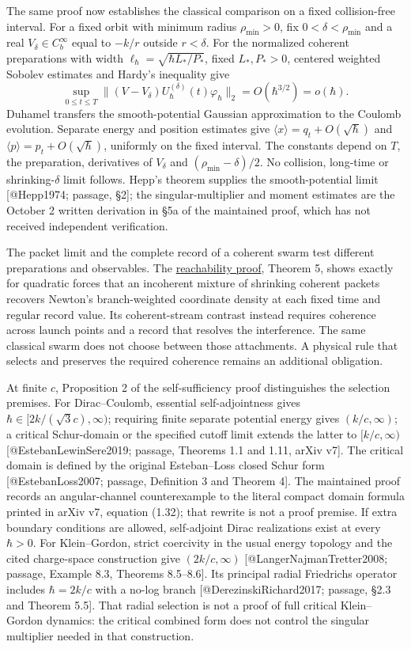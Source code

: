 \documentclass[11pt,a4paper]{article}
\begin{document}
The same proof now establishes the classical comparison on a fixed
collision-free interval. For a fixed orbit with minimum radius
\(\rho_{\min}>0\), fix \(0<\delta<\rho_{\min}\) and a real
\(V_\delta\in C_b^\infty\) equal to \(-k/r\) outside \(r<\delta\). For
the normalized coherent preparations with width
\(\ell_\hbar=\sqrt{\hbar L_*/P_*}\), fixed \(L_*,P_*>0\), centered
weighted Sobolev estimates and Hardy's inequality give
\[\sup_{0\le t\le T}\|(V-V_\delta)U_\hbar^{(\delta)}(t)\varphi_\hbar\|_2
=O(\hbar^{3/2})=o(\hbar).\] Duhamel transfers the smooth-potential
Gaussian approximation to the Coulomb evolution. Separate energy and
position estimates give \(\langle x\rangle=q_t+O(\sqrt\hbar)\) and
\(\langle p\rangle=p_t+O(\sqrt\hbar)\), uniformly on the fixed interval.
The constants depend on \(T\), the preparation, derivatives of
\(V_\delta\) and \((\rho_{\min}-\delta)/2\). No collision, long-time or
shrinking-\(\delta\) limit follows. Hepp's theorem supplies the
smooth-potential limit {[}@Hepp1974; passage, §2{]}; the
singular-multiplier and moment estimates are the October 2 written
derivation in §5a of the maintained proof, which has not received
independent verification.

The packet limit and the complete record of a coherent swarm test
different preparations and observables. The
\href{zero-branch-reachability.md}{reachability proof}, Theorem 5, shows
exactly for quadratic forces that an incoherent mixture of shrinking
coherent packets recovers Newton's branch-weighted coordinate density at
each fixed time and regular record value. Its coherent-stream contrast
instead requires coherence across launch points and a record that
resolves the interference. The same classical swarm does not choose
between those attachments. A physical rule that selects and preserves
the required coherence remains an additional obligation.

At finite \(c\), Proposition 2 of the self-sufficiency proof
distinguishes the selection premises. For Dirac--Coulomb, essential
self-adjointness gives \(\hbar\in[2k/(\sqrt3c),\infty)\); requiring
finite separate potential energy gives \((k/c,\infty)\); a critical
Schur-domain or the specified cutoff limit extends the latter to
\([k/c,\infty)\) {[}@EstebanLewinSere2019; passage, Theorems 1.1 and
1.11, arXiv v7{]}. The critical domain is defined by the original
Esteban--Loss closed Schur form {[}@EstebanLoss2007; passage, Definition
3 and Theorem 4{]}. The maintained proof records an angular-channel
counterexample to the literal compact domain formula printed in arXiv
v7, equation (1.32); that rewrite is not a proof premise. If extra
boundary conditions are allowed, self-adjoint Dirac realizations exist
at every \(\hbar>0\). For Klein--Gordon, strict coercivity in the usual
energy topology and the cited charge-space construction give
\((2k/c,\infty)\) {[}@LangerNajmanTretter2008; passage, Example 8.3,
Theorems 8.5--8.6{]}. Its principal radial Friedrichs operator includes
\(\hbar=2k/c\) with a no-log branch {[}@DerezinskiRichard2017; passage,
§2.3 and Theorem 5.5{]}. That radial selection is not a proof of full
critical Klein--Gordon dynamics: the critical combined form does not
control the singular multiplier needed in that construction.
\end{document}
